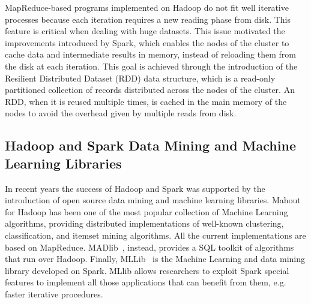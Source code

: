\documentclass[preprint,review,12pt]{elsarticle}
\begin{document}
MapReduce-based programs implemented on Hadoop do not fit well iterative processes because 
each iteration requires a new reading phase from disk.
This feature is critical when dealing with huge datasets.
This issue motivated the improvements introduced by Spark, 
which enables the nodes of the cluster to cache data and intermediate results
in memory, instead of reloading them from the disk at each iteration. This goal is achieved through
the introduction of the Resilient Distributed Dataset (RDD) data structure, which is a read-only
partitioned collection of records distributed across the nodes of the cluster. An RDD, when it is reused multiple times,
is cached in the main memory of the nodes to avoid the overhead given by multiple reads from disk.

\subsection{Hadoop and Spark Data Mining and Machine Learning Libraries}
In recent years the success of Hadoop and Spark was supported by the introduction of open
source data mining and machine learning libraries.
Mahout~\cite{Mahout} for Hadoop has been one of the most popular
collection of Machine Learning algorithms, providing distributed implementations of well-known clustering, classification, and itemset mining algorithms.
All the current implementations are based on MapReduce.
MADlib~\cite{madlib}, instead, provides a SQL toolkit of algorithms that run over Hadoop. Finally,
MLLib~\cite{MLLib} is the Machine Learning and data mining library developed on Spark. MLlib allows researchers to exploit Spark special features
to implement all those applications that can benefit from them, e.g. faster iterative procedures.
\end{document}
